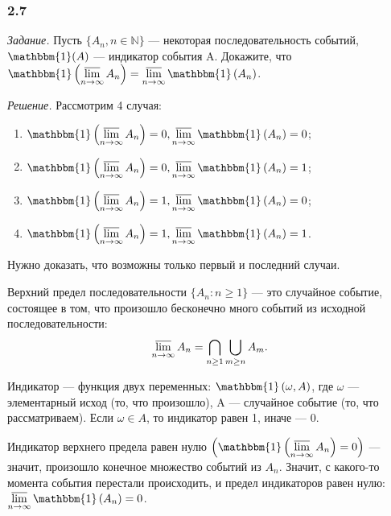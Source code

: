 \subsubsection*{2.7}

\textit{Задание.} Пусть $ \{ A_n, n \in \mathbb{N} \} $ --- некоторая последовательность событий, $ \mathbbm{1} ( A ) $ --- индикатор события A.
Докажите, что $ \mathbbm{ 1 } \left( \varlimsup \limits_{ n \to \infty } A_n \right) =
\varlimsup \limits_{ n \to \infty } \mathbbm{ 1 } \left( A_n \right) $.

\textit{Решение.} Рассмотрим 4 случая: 

\begin{enumerate}
\item $ \mathbbm{ 1 } \left( \varlimsup \limits_{ n \to \infty } A_n \right) = 0,
\varlimsup \limits_{ n \to \infty } \mathbbm{ 1 } \left( A_n \right) = 0 $;
\item $ \mathbbm{ 1 } \left( \varlimsup \limits_{ n \to \infty } A_n \right) = 0,
\varlimsup \limits_{ n \to \infty } \mathbbm{ 1 } \left( A_n \right) = 1 $;
\item $ \mathbbm{ 1 } \left( \varlimsup \limits_{ n \to \infty } A_n \right) = 1,
\varlimsup \limits_{ n \to \infty } \mathbbm{ 1 } \left( A_n \right) = 0 $;
\item $ \mathbbm{ 1 } \left( \varlimsup \limits_{ n \to \infty } A_n \right) = 1,
\varlimsup \limits_{ n \to \infty } \mathbbm{ 1 } \left( A_n \right) = 1 $.
\end{enumerate}

Нужно доказать, что возможны только первый и последний случаи.

Верхний предел последовательности
$ \{ A_n : n \geq 1 \} $ --- это случайное событие, состоящее в том, что произошло бесконечно много событий из исходной последовательности:
$$ \varlimsup \limits_{ n \to \infty } A_n =
\bigcap \limits_{ n \geq 1} \bigcup \limits_{ m \geq n} A_m.$$

Индикатор --- функция двух переменных:
$ \mathbbm{1} \left( \omega, A \right) $,
где $\omega$ --- элементарный исход (то, что произошло), A --- случайное событие (то, что рассматриваем).
Если $\omega \in A$, то индикатор равен 1, иначе --- 0.

Индикатор верхнего предела равен нулю
$ \left( \mathbbm{ 1 } \left( \varlimsup \limits_{ n \to \infty } A_n \right) = 0 \right)$ --- значит, произошло конечное множество событий из $A_n$.
Значит, с какого-то момента события перестали происходить, и предел индикаторов равен нулю: $ \varlimsup \limits_{ n \to \infty } \mathbbm{ 1 } \left( A_n \right) = 0$.

